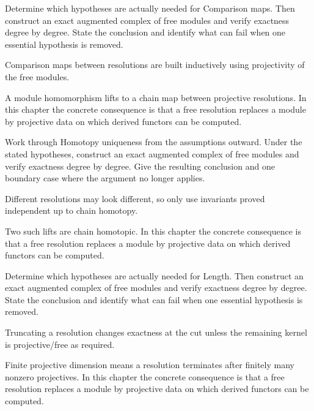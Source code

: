 \begin{exercise}\label{exr:v23-05}
Determine which hypotheses are actually needed for Comparison maps. Then construct an exact augmented complex of free modules and verify exactness degree by degree. State the conclusion and identify what can fail when one essential hypothesis is removed.
\end{exercise}
\begin{hint}
Comparison maps between resolutions are built inductively using projectivity of the free modules.
\end{hint}
\begin{solution}
A module homomorphism lifts to a chain map between projective resolutions. In this chapter the concrete consequence is that a free resolution replaces a module by projective data on which derived functors can be computed.
\end{solution}

\begin{exercise}\label{exr:v23-06}
Work through Homotopy uniqueness from the assumptions outward. Under the stated hypotheses, construct an exact augmented complex of free modules and verify exactness degree by degree. Give the resulting conclusion and one boundary case where the argument no longer applies.
\end{exercise}
\begin{hint}
Different resolutions may look different, so only use invariants proved independent up to chain homotopy.
\end{hint}
\begin{solution}
Two such lifts are chain homotopic. In this chapter the concrete consequence is that a free resolution replaces a module by projective data on which derived functors can be computed.
\end{solution}

\begin{exercise}\label{exr:v23-07}
Determine which hypotheses are actually needed for Length. Then construct an exact augmented complex of free modules and verify exactness degree by degree. State the conclusion and identify what can fail when one essential hypothesis is removed.
\end{exercise}
\begin{hint}
Truncating a resolution changes exactness at the cut unless the remaining kernel is projective/free as required.
\end{hint}
\begin{solution}
Finite projective dimension means a resolution terminates after finitely many nonzero projectives. In this chapter the concrete consequence is that a free resolution replaces a module by projective data on which derived functors can be computed.
\end{solution}

